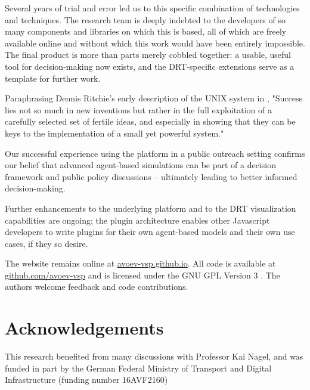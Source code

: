 Several years of trial and error led us to this specific combination of technologies and techniques. The research team is deeply indebted to the developers of so many components and libraries on which this is based, all of which are freely available online and without which this work would have been entirely impossible. The final product is more than parts merely cobbled together: a usable, useful tool for decision-making now exists, and the DRT-specific extensions serve as a template for further work.

Paraphrasing Dennis Ritchie's early description of the UNIX system in \citet{Ritchie1978}, "Success lies not so much in new inventions but rather in the full exploitation of a carefully selected set of fertile ideas, and especially in showing that they can be keys to the implementation of a small yet powerful system."

Our successful experience using the platform in a public outreach setting confirms our belief that advanced agent-based simulations can be part of a decision framework and public policy discussions -- ultimately leading to better informed decision-making.

Further enhancements to the underlying platform and to the DRT visualization capabilities are ongoing; the plugin architecture enables other Javascript developers to write plugins for their own agent-based models and their own use cases, if they so desire.

The website remains online at \href{https://avoev-vsp.github.io}{avoev-vsp.github.io}. All code is available at \href{https://github.com/avoev-vsp/avoev-vsp.github.io}{github.com/avoev-vsp} and is licensed under the GNU GPL Version 3 \cite{FSF2007GnuGPL}. The authors welcome feedback and code contributions.

\section{Acknowledgements}
This research benefited from many discussions with Professor Kai Nagel, and was funded in part by the German Federal Ministry of Transport and Digital Infrastructure (funding number 16AVF2160)
